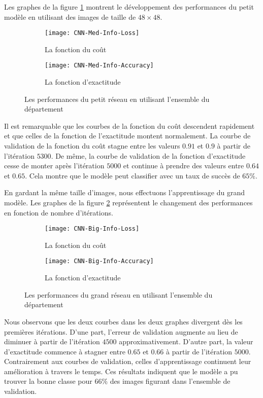 Les graphes de la figure \ref{fig:med_info} montrent le développement des performances
du petit modèle en utilisant des images de taille de $48 \times 48$.

\begin{figure}[h]
\centering
\begin{subfigure}{0.64\textwidth}
  \texttt{[image: CNN-Med-Info-Loss]}
  \caption{La fonction du coût}
\end{subfigure}
\begin{subfigure}{0.64\textwidth}
  \texttt{[image: CNN-Med-Info-Accuracy]}
  \caption{La fonction d'exactitude}
\end{subfigure}
\caption{Les performances du petit réseau en utilisant l'ensemble du département\label{fig:med_info}}
\end{figure}

Il est remarquable que les courbes de la fonction du coût descendent rapidement
et que celles de la fonction de l'exactitude montent normalement. La courbe de
validation de la fonction du coût stagne entre les valeurs $0.91$ et $0.9$ à partir
de l'itération $5300$. De même, la courbe de validation de la fonction d'exactitude
cesse de monter après l'itération $5000$ et continue à prendre des valeurs entre
$0.64$ et $0.65$. Cela montre que le modèle peut classifier avec un taux de
succès de $65 \%$.

En gardant la même taille d'images, nous effectuons l'apprentissage du grand modèle.
Les graphes de la figure \ref{fig:big_info} représentent le changement des performances en fonction de
nombre d'itérations.

\begin{figure}[H]
\centering
\begin{subfigure}{0.64\textwidth}
  \texttt{[image: CNN-Big-Info-Loss]}
  \caption{La fonction du coût}
\end{subfigure}
\begin{subfigure}{0.64\textwidth}
  \texttt{[image: CNN-Big-Info-Accuracy]}
  \caption{La fonction d'exactitude}
\end{subfigure}
\caption{Les performances du grand réseau en utilisant l'ensemble du département\label{fig:big_info}}
\end{figure}

Nous observons que les deux courbes dans les deux graphes divergent dès les
premières itérations. D'une part, l'erreur de validation augmente au lieu de diminuer
à partir de l'itération $4500$ approximativement. D'autre part, la valeur d'exactitude
commence à stagner entre $0.65$ et $0.66$ à partir de l'itération $5000$. Contrairement
aux courbes de validation, celles d'apprentissage continuent leur amélioration
à travers le temps. Ces résultats indiquent que le modèle a pu trouver la bonne
classe pour $66 \%$ des images figurant dans l'ensemble de validation.

